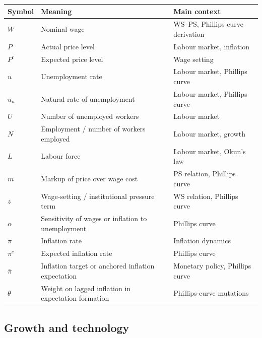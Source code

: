 \documentclass[12pt]{article}
\begin{document}
\begin{center}
\renewcommand{\arraystretch}{1.2}
\begin{tabular}{|p{2.0cm}|p{8.0cm}|p{4.8cm}|}
\hline
\textbf{Symbol} & \textbf{Meaning} & \textbf{Main context} \\
\hline
\(W\) & Nominal wage & WS--PS, Phillips curve derivation \\
\hline
\(P\) & Actual price level & Labour market, inflation \\
\hline
\(P^e\) & Expected price level & Wage setting \\
\hline
\(u\) & Unemployment rate & Labour market, Phillips curve \\
\hline
\(u_n\) & Natural rate of unemployment & Labour market, Phillips curve \\
\hline
\(U\) & Number of unemployed workers & Labour market \\
\hline
\(N\) & Employment / number of workers employed & Labour market, growth \\
\hline
\(L\) & Labour force & Labour market, Okun's law \\
\hline
\(m\) & Markup of price over wage cost & PS relation, Phillips curve \\
\hline
\(z\) & Wage-setting / institutional pressure term & WS relation, Phillips curve \\
\hline
\(\alpha\) & Sensitivity of wages or inflation to unemployment & Phillips curve \\
\hline
\(\pi\) & Inflation rate & Inflation dynamics \\
\hline
\(\pi^e\) & Expected inflation rate & Phillips curve \\
\hline
\(\bar{\pi}\) & Inflation target or anchored inflation expectation & Monetary policy, Phillips curve \\
\hline
\(\theta\) & Weight on lagged inflation in expectation formation & Phillips-curve mutations \\
\hline
\end{tabular}
\end{center}

\subsection*{Growth and technology}
\end{document}
